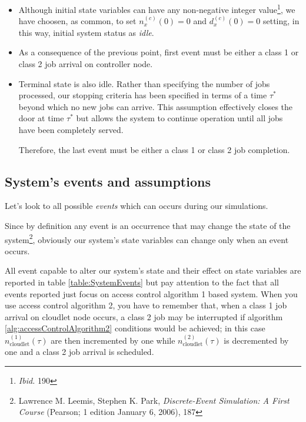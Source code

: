 \documentclass[10pt,a4paper]{article}
\begin{document}
\begin{itemize}
\item Although initial state variables can have any non-negative integer value\footnote{\textit{Ibid.} 190}, we have choosen, as common, to set $n_x^{(c)}(0) = 0$ and $d_x^{(c)}(0) = 0$ setting, in this way, initial system status as \textit{idle}. 

\item As a consequence of the previous point, first event must be either a class 1 or class 2 job arrival on controller node.

\item Terminal state is also idle. Rather than specifying the number of jobs processed, our stopping criteria has been specified in terms of a time $\tau^*$ beyond which no new jobs can arrive. This assumption effectively closes the door at time $\tau^*$ but allows the system to continue operation until all jobs have been completely served. 

Therefore, the last event must be either a class 1 or class 2 job completion.
\end{itemize}


\subsection{System's events and assumptions}

Let's look to all possible \textit{events} which can occurs during our simulations. 

Since by definition any event is an occurrence that may change the state of the system\footnote{Lawrence M. Leemis, Stephen K. Park, \textit{Discrete-Event Simulation: A First Course} (Pearson; 1 edition January 6, 2006), 187}, obviously our system's state variables can change only when an event occurs.

All event capable to alter our system's state and their effect on state variables are reported in table \ref{table:SystemEvents} but pay attention to the fact that all events reported just focus on access control algorithm 1 based system. When you use access control algorithm 2, you have to remember that, when a class 1 job arrival on cloudlet node occurs, a class 2 job may be interrupted if algorithm \ref{alg:accessControlAlgorithm2} conditions would be achieved; in this case $n_{\text{cloudlet}}^{(1)}(\tau)$ are then incremented by one while $n_{\text{cloudlet}}^{(2)}(\tau)$ is decremented by one and a class 2 job arrival is scheduled.
 
\end{document}
